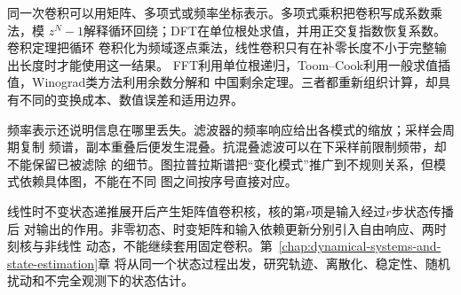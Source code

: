 同一次卷积可以用矩阵、多项式或频率坐标表示。多项式乘积把卷积写成系数乘法，模
$z^N-1$解释循环回绕；DFT在单位根处求值，并用正交复指数恢复系数。卷积定理把循环
卷积化为频域逐点乘法，线性卷积只有在补零长度不小于完整输出长度时才能使用这一结果。
FFT利用单位根递归，Toom--Cook利用一般求值插值，Winograd类方法利用余数分解和
中国剩余定理。三者都重新组织计算，却具有不同的变换成本、数值误差和适用边界。

频率表示还说明信息在哪里丢失。滤波器的频率响应给出各模式的缩放；采样会周期复制
频谱，副本重叠后便发生混叠。抗混叠滤波可以在下采样前限制频带，却不能保留已被滤除
的细节。图拉普拉斯谱把“变化模式”推广到不规则关系，但模式依赖具体图，不能在不同
图之间按序号直接对应。

线性时不变状态递推展开后产生矩阵值卷积核，核的第$r$项是输入经过$r$步状态传播后
对输出的作用。非零初态、时变矩阵和输入依赖更新分别引入自由响应、两时刻核与非线性
动态，不能继续套用固定卷积。第~\ref{chap:dynamical-systems-and-state-estimation}章
将从同一个状态过程出发，研究轨迹、离散化、稳定性、随机扰动和不完全观测下的状态估计。

